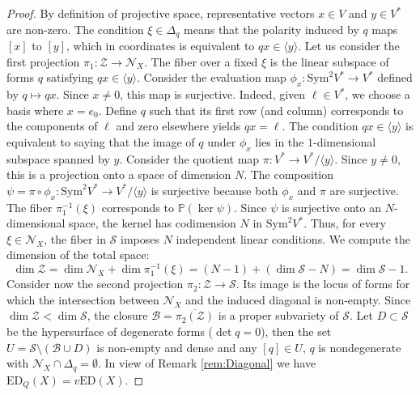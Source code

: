 \documentclass[11pt]{article}
\numberwithin{equation}{section}
\numberwithin{figure}{section}
\theoremstyle{plain}
\theoremstyle{definition}
\theoremstyle{remark}
\newcommand{\ED}{\mathrm{ED}}
\newcommand{\vED}{v\mathrm{ED}}
\begin{document}
\begin{proof}
By definition of projective space, representative vectors $x \in V$ and $y \in V^{\ast}$ are non-zero. The condition $\xi \in \Delta_{q}$ means that the polarity induced by $q$ maps $\left[ x \right]$ to $\left[ y \right]$, which in coordinates is equivalent to $qx \in \langle y \rangle$.
Let us consider the first projection $\pi_{1}: \mathcal{Z} \to \mathcal{N}_{X}$. The fiber over a fixed $\xi$ is the linear subspace of forms $q$ satisfying $qx \in \langle y \rangle$.
Consider the evaluation map $\phi_{x}: \mathrm{Sym}^{2} V^{\ast} \to V^{\ast}$ defined by $q \mapsto qx$. Since $x \neq 0$, this map is surjective. Indeed, given $\ell \in V^{\ast}$, we choose a basis where $x = e_{0}$. Define $q$ such that its first row (and column) corresponds to the components of $\ell$ and zero elsewhere yields $qx = \ell$.
The condition $qx \in \langle y \rangle$ is equivalent to saying that the image of $q$ under $\phi_{x}$ lies in the $1$-dimensional subspace spanned by $y$. Consider the quotient map $\pi: V^{\ast} \to V^{\ast}/\langle y \rangle$. Since $y \neq 0$, this is a projection onto a space of dimension $N$. The composition $\psi = \pi \circ \phi_{x}: \mathrm{Sym}^{2} V^{\ast} \to V^{\ast}/\langle y \rangle$ is surjective because both $\phi_{x}$ and $\pi$ are surjective.
The fiber $\pi_{1}^{-1}\left( \xi \right)$ corresponds to $\mathbb{P}\left( \ker \psi \right)$. Since $\psi$ is surjective onto an $N$-dimensional space, the kernel has codimension $N$ in $\mathrm{Sym}^{2} V^{\ast}$. Thus, for every $\xi \in \mathcal{N}_{X}$, the fiber in $\mathcal{S}$ imposes $N$ independent linear conditions.
We compute the dimension of the total space:
\[
\dim \mathcal{Z} = \dim \mathcal{N}_{X} + \dim \pi_{1}^{-1}\left( \xi \right) = \left( N-1 \right) + \left( \dim \mathcal{S} - N \right) = \dim \mathcal{S} - 1.
\]
Consider now the second projection $\pi_{2}: \mathcal{Z} \to \mathcal{S}$. Its image is the locus of forms for which the intersection between $\mathcal N _X$ and the induced diagonal is non-empty. Since $\dim \mathcal{Z} < \dim \mathcal{S}$, the closure $\mathcal{B} = \overline{\pi_{2}\left( \mathcal{Z} \right)}$ is a proper subvariety of $\mathcal{S}$.
Let $D \subset \mathcal{S}$ be the hypersurface of degenerate forms ($\det q = 0$), then the set $U = \mathcal{S} \setminus \left( \mathcal{B} \cup D \right)$ is non-empty and dense and any $\left[ q \right] \in U$, $q$ is nondegenerate with $\mathcal{N}_{X} \cap \Delta_{q} = \emptyset$. In view of Remark \ref{rem:Diagonal} we have $\ED_Q\left( X \right) = \vED\left( X \right)$.
\end{proof}
\end{document}
